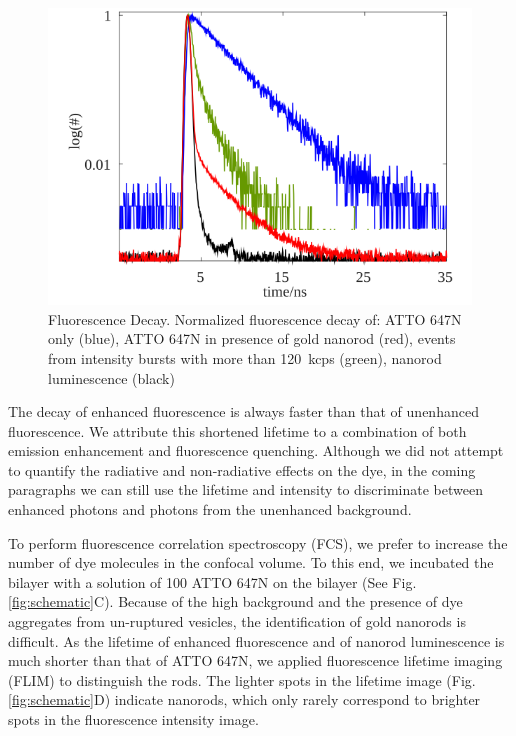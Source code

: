 \begin{figure}
	\centering
	\includegraphics[]{lifetime_enhnc}
	\caption{Fluorescence Decay. Normalized fluorescence decay of: ATTO 647N only (blue), ATTO 647N in presence of gold nanorod (red), events from intensity bursts with more than \SI{120}{kcps} (green), nanorod luminescence (black)}
	\label{fig:lifetime_enhnc}
\end{figure}


The decay of enhanced fluorescence is always faster than that of unenhanced fluorescence.
We attribute this shortened lifetime to a combination of both emission enhancement and fluorescence quenching.
Although we did not attempt to quantify the radiative and non-radiative effects on the dye, in the coming paragraphs we can still use the lifetime and intensity to discriminate between enhanced photons and photons from the unenhanced background.


To perform fluorescence correlation spectroscopy (FCS), we prefer to increase the number of dye molecules in the confocal volume.
To this end, we incubated the bilayer with a solution of \SI{100}{\nM} ATTO 647N on the bilayer (See Fig. \ref{fig:schematic}C).
Because of the high background and the presence of dye aggregates from un-ruptured vesicles, the identification of gold nanorods is difficult.
As the lifetime of enhanced fluorescence and of nanorod luminescence is much shorter than that of ATTO 647N, we applied fluorescence lifetime imaging (FLIM) to distinguish the rods.
The lighter spots in the lifetime image (Fig.\ref{fig:schematic}D) indicate nanorods, which only rarely correspond to brighter spots in the fluorescence intensity image.


